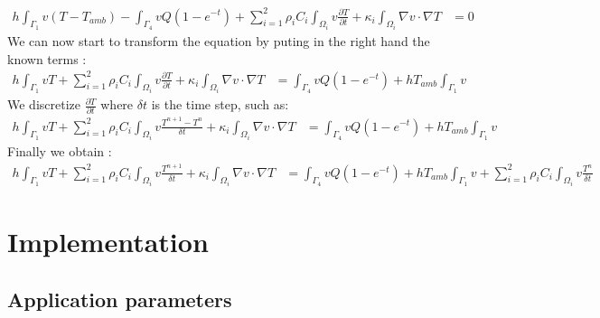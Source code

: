 \begin{equation}
   \begin{split}
 \displaystyle{ h \int_{\Gamma_1}{v(T-T_{amb})} - \int_{\Gamma_4} {vQ(1-e^{-t})}  + \sum_{i=1}^{2} \rho_i C_i \int_{\varOmega_i} v\frac{ \partial T}{\partial t} + \kappa_i \int_{\varOmega_i} {\nabla v \cdot \nabla T} } & =   0 
  \end{split}
\end{equation}
We can now start to transform the equation by puting in the right hand the known terms :
\begin{equation}
   \begin{split}
 \displaystyle{ h \int_{\Gamma_1}{v T}  + \sum_{i=1}^{2} \rho_i C_i \int_{\varOmega_i} v\frac{ \partial T}{\partial t} + \kappa_i \int_{\varOmega_i} {\nabla v \cdot \nabla T} } & =  
 \int_{\Gamma_4} {vQ(1-e^{-t})}	 +  hT_{amb}\int_{\Gamma_1}{v}
  \end{split}
\end{equation}
We discretize $\displaystyle{\frac{\partial T}{\partial t}}$ where $\delta t$ is the time step, such as:
\begin{equation}
   \begin{split}
 \displaystyle{ h \int_{\Gamma_1}{v T} + \sum_{i=1}^{2} \rho_i C_i \int_{\varOmega_i} v\frac{T^{n+1} - T^n}{\delta t} + \kappa_i \int_{\varOmega_i} {\nabla v \cdot \nabla T} } & =  
 \int_{\Gamma_4} {vQ(1-e^{-t})}	 +  hT_{amb}\int_{\Gamma_1}{v}
  \end{split}
\end{equation}
Finally we obtain :
\begin{equation}
   \begin{split}
 \displaystyle{ h \int_{\Gamma_1}{v T} + \sum_{i=1}^{2} \rho_i C_i \int_{\varOmega_i} v\frac{T^{n+1}}{\delta t} + \kappa_i \int_{\varOmega_i} {\nabla v \cdot \nabla T}} & =  
	\displaystyle{ \int_{\Gamma_4} {vQ(1-e^{-t})} +  hT_{amb}\int_{\Gamma_1}{v}	+  \sum_{i=1}^{2}  \rho_i C_i \int_{\varOmega_i} v \frac{T^n}{\delta t}  }
  \end{split}
\end{equation}

\section{Implementation}
\label{heat:impl}

\subsection{Application parameters}
\label{heat:param}

